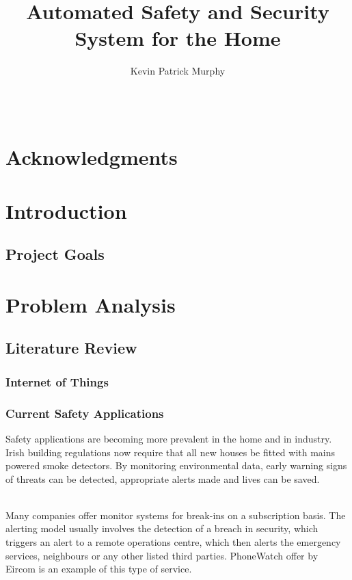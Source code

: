 \documentclass{article}
\begin{document}
\title{Automated Safety and Security System for the Home}

\author{Kevin Patrick Murphy}

\maketitle

\begin{abstract}

{\ }

\end{abstract}

\newpage

\tableofcontents

\newpage

\section*{Acknowledgments}

\section{Introduction}
\subsection{Project Goals}

\section{Problem Analysis}
\subsection{Literature Review}
\subsubsection{Internet of Things}
\subsubsection{Current Safety Applications}
Safety applications are becoming more prevalent in the home and in industry. Irish building regulations now require that all new houses be fitted with mains powered smoke detectors. By monitoring environmental data, early warning signs of threats can be detected, appropriate alerts made and lives can be saved.\\\

Many companies offer monitor systems for break-ins on a subscription basis. The alerting model usually involves the detection of a breach in security, which triggers an alert to a remote operations centre, which then alerts the emergency services, neighbours or any other listed third parties. PhoneWatch offer by Eircom is an example of this type of service. \\\
\end{document}
